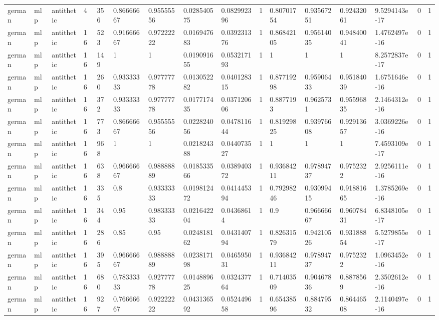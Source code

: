 \begin{tabular}{llllllllllllllll}
german & mlp & antithetic & 4 & 356 & 0.86666667 & 0.95555556 & 0.028540575 & 0.082992396 & 1 & 0.80701754 & 0.93567251 & 0.92432061 & 9.5294143e-17 & 0 & 1 \\
german & mlp & antithetic & 16 & 523 & 0.91666667 & 0.97222222 & 0.016947683 & 0.039231376 & 1 & 0.86842105 & 0.95614035 & 0.94840041 & 1.4762497e-16 & 0 & 1 \\
german & mlp & antithetic & 16 & 149 & 1 & 1 & 0.019091655 & 0.053217193 & 1 & 1 & 1 & 1 & 8.2572837e-17 & 0 & 1 \\
german & mlp & antithetic & 16 & 260 & 0.93333333 & 0.97777778 & 0.013052282 & 0.040128315 & 1 & 0.87719298 & 0.95906433 & 0.95184039 & 1.6751646e-16 & 0 & 1 \\
german & mlp & antithetic & 16 & 372 & 0.93333333 & 0.97777778 & 0.017717435 & 0.037120606 & 1 & 0.8877193 & 0.9625731 & 0.95596835 & 2.1464312e-16 & 0 & 1 \\
german & mlp & antithetic & 16 & 773 & 0.86666667 & 0.95555556 & 0.022824056 & 0.047811644 & 1 & 0.81929825 & 0.93976608 & 0.92913657 & 3.0369226e-16 & 0 & 1 \\
german & mlp & antithetic & 16 & 968 & 1 & 1 & 0.021824388 & 0.044073527 & 1 & 1 & 1 & 1 & 7.4593109e-17 & 0 & 1 \\
german & mlp & antithetic & 16 & 638 & 0.96666667 & 0.98888889 & 0.018533566 & 0.038940372 & 1 & 0.93684211 & 0.97894737 & 0.9752322 & 2.9256111e-16 & 0 & 1 \\
german & mlp & antithetic & 16 & 335 & 0.8 & 0.93333333 & 0.019812472 & 0.041445394 & 1 & 0.79298246 & 0.93099415 & 0.91881665 & 1.3785269e-16 & 0 & 1 \\
german & mlp & antithetic & 16 & 344 & 0.95 & 0.98333333 & 0.021642204 & 0.04368614 & 1 & 0.9 & 0.96666667 & 0.96078431 & 6.8348105e-17 & 0 & 1 \\
german & mlp & antithetic & 16 & 286 & 0.85 & 0.95 & 0.024818162 & 0.043140794 & 1 & 0.82631579 & 0.94210526 & 0.93188854 & 5.5279855e-17 & 0 & 1 \\
german & mlp & antithetic & 16 & 395 & 0.96666667 & 0.98888889 & 0.023817198 & 0.046595031 & 1 & 0.93684211 & 0.97894737 & 0.9752322 & 1.0963452e-16 & 0 & 1 \\
german & mlp & antithetic & 16 & 680 & 0.78333333 & 0.92777778 & 0.014889625 & 0.032437764 & 1 & 0.71403509 & 0.90467836 & 0.8878569 & 2.3502612e-16 & 0 & 1 \\
german & mlp & antithetic & 16 & 927 & 0.76666667 & 0.92222222 & 0.043136592 & 0.052449658 & 1 & 0.65438596 & 0.88479532 & 0.86446508 & 2.1140497e-16 & 0 & 1 \\

\end{tabular}

